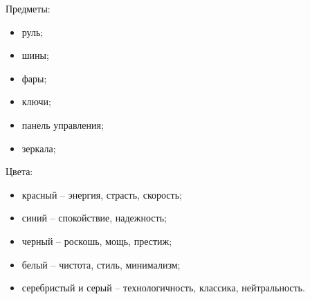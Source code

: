 Предметы:
\begin{itemize}
    \item руль;
    \item шины;
    \item фары;
    \item ключи;
    \item панель управления;
    \item зеркала;
\end{itemize}
\bigskip

Цвета:
\begin{itemize}
    \item красный – энергия, страсть, скорость;
    \item синий – спокойствие, надежность;
    \item черный – роскошь, мощь, престиж;
    \item белый – чистота, стиль, минимализм;
    \item серебристый и серый – технологичность, классика, нейтральность.
\end{itemize}
\bigskip

\noindent
\begin{minipage}{\linewidth}
\end{minipage}
\bigskip

\noindent
\begin{minipage}{\linewidth}
\end{minipage}
\bigskip

